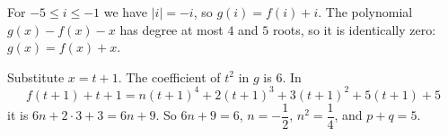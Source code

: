 For $-5\le i\le-1$ we have $|i|=-i$, so $g(i)=f(i)+i$. The polynomial $g(x)-f(x)-x$ has degree at most $4$ and $5$ roots, so it is identically zero: $g(x)=f(x)+x$.

Substitute $x=t+1$. The coefficient of $t^2$ in $g$ is $6$. In
\[f(t+1)+t+1=n(t+1)^4+2(t+1)^3+3(t+1)^2+5(t+1)+5\]
it is $6n+2\cdot3+3=6n+9$. So $6n+9=6$, $n=-\dfrac12$, $n^2=\dfrac14$, and $p+q=\boxed{5}$.
